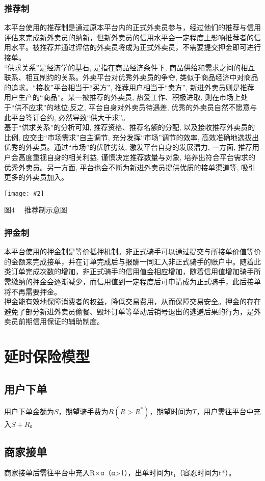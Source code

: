 \documentclass[UTF8]{ctexart}
\newcommand\picturehere[2][1]{\centerline{\texttt{[image: \#2]}}}
\newcommand\picfig[1]{\centerline{\small \heiti #1 \songti }}
\begin{document}
\begin{multicols}{2}
  \subsubsection{推荐制}
  \indent 本平台使用的推荐制是通过原本平台内的正式外卖员参与，经过他们的推荐与信用评估来完成新外卖员的纳新，但新外卖员的信用水平会一定程度上影响推荐者的信用水平。被推荐并通过评估的外卖员将成为正式外卖员，不需要提交押金即可进行接单。\\
  \indent “供求关系”是经济学的基石, 是指在商品经济条件下, 商品供给和需求之间的相互联系、相互制约的关系。外卖平台对优秀外卖员的争夺, 类似于商品经济中对商品的追求。“接收”平台相当于“买方”, 推荐用户相当于“卖方”, 新进外卖员则是推荐用户生产的“商品”。某一被推荐的外卖员, 热爱工作、积极进取, 则在市场上处于“供不应求”的地位;反之, 平台自身对外卖员待遇差, 优秀的外卖员自然不愿意与此平台签订合约, 必然导致“供大于求”。\\
  \indent 基于“供求关系”的分析可知, 推荐资格、推荐名额的分配, 以及接收推荐外卖员的比例, 应交由“市场需求”自主调节, 充分发挥“市场”调节的效率, 高效准确地选拔出优秀的外卖员。通过“市场”的优胜劣汰, 激发平台自身的发展潜力, 一方面, 推荐用户会高度重视自身的相关利益, 谨慎决定推荐数量与对象, 培养出符合平台需求的优秀外卖员。另一方面, 平台也会不断为新进外卖员提供优质的接单渠道等, 吸引更多的外卖员加入。
  \picturehere[0.45]{image/tree.png}
  \picfig{图4  \ \ 推荐制示意图}
  \subsubsection{押金制}
  \indent 本平台使用的押金制是等价抵押机制。非正式骑手可以通过提交与所接单价值等价的金额来完成接单，并在订单完成后与报酬一同汇入非正式骑手的账户中。随着此类订单完成次数的增加，非正式骑手的信用值会相应增加，随着信用值增加骑手所需缴纳的押金会逐渐减少，而信用值到一定程度后可申请成为正式骑手，此后接单将不再需要押金。\\
  \indent 押金能有效地保障消费者的权益，降低交易费用，从而保障交易安全。押金的存在避免了部分新进外卖员偷餐、毁坏订单等举动后销号退出的逃避后果的行为，是外卖员前期信用保证的辅助制度。
  \section{延时保险模型}
  \subsection{用户下单}
  用户下单金额为$S$，期望骑手费为$R(R>R^{*})$，期望时间为$T$，用户需往平台中充入$S+R$。
  \subsection{商家接单}
  商家接单后需往平台中充入R×α（α>1），出单时间为t₁（容忍时间为t*）。

\end{multicols}




\end{document}
